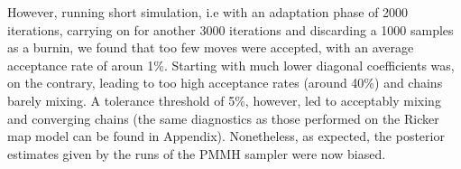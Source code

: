 \documentclass[12pt]{article}
\begin{document}
	However, running short simulation, i.e with an adaptation phase of 2000 iterations, carrying on for another 3000 iterations and discarding a 1000 samples as a burnin, we found that too few moves were accepted, with an average acceptance rate of aroun 1\%. Starting with much lower diagonal coefficients was, on the contrary, leading to too high acceptance rates (around 40\%) and chains barely mixing. A tolerance threshold of 5\%, however, led to acceptably mixing and converging chains (the same diagnostics as those performed on the Ricker map model can be found in Appendix). Nonetheless, as expected, the posterior estimates given by the runs of the PMMH sampler were now biased.
	
	
\clearpage

	
	{}
	
\end{document}
